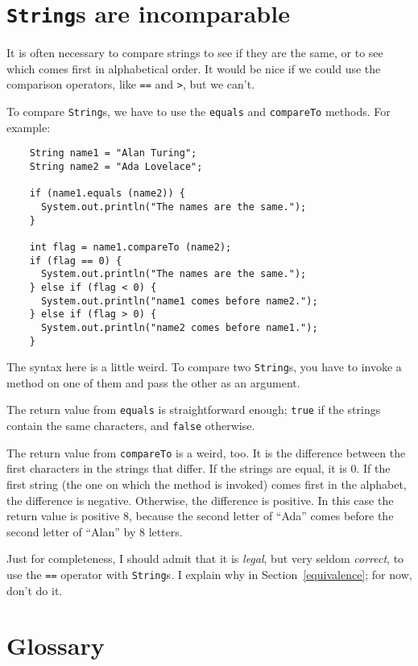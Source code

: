 \documentclass[12pt]{book}
\theoremstyle{definition}
\begin{document}
\section{{\tt String}s are incomparable}
\label{incomparable}

It is often necessary to compare strings to see if they are the same,
or to see which comes first in alphabetical order.  It would be
nice if we could use the comparison operators, like {\tt ==} and
{\tt >}, but we can't.

To compare {\tt String}s, we have to use the {\tt equals}
and {\tt compareTo} methods.  For example:

\begin{lstlisting}
    String name1 = "Alan Turing";
    String name2 = "Ada Lovelace";

    if (name1.equals (name2)) {
      System.out.println("The names are the same.");
    }

    int flag = name1.compareTo (name2);
    if (flag == 0) {
      System.out.println("The names are the same.");
    } else if (flag < 0) {
      System.out.println("name1 comes before name2.");
    } else if (flag > 0) {
      System.out.println("name2 comes before name1.");
    }
\end{lstlisting}
%
The syntax here is a little weird.  To compare two {\tt String}s,
you have to invoke a method on one of them and pass the other as an
argument.

The return value from {\tt equals} is straightforward enough;
{\tt true} if the strings contain the same characters, and
{\tt false} otherwise.

The return value from {\tt compareTo} is a weird, too.  It is
the difference between the first characters in the strings
that differ.  If the strings are equal, it is 0.  If the
first string (the one on which the method is invoked) comes
first in the alphabet, the difference is negative.  Otherwise,
the difference is positive.  In this case the return value
is positive 8, because the second letter of ``Ada'' comes
before the second letter of ``Alan'' by 8 letters.

Just for completeness, I should admit that it is {\em legal}, but very
seldom {\em correct}, to use the {\tt ==} operator with {\tt String}s.
I explain why in Section~\ref{equivalence}; for now, don't do it.


\section{Glossary}
\end{document}
